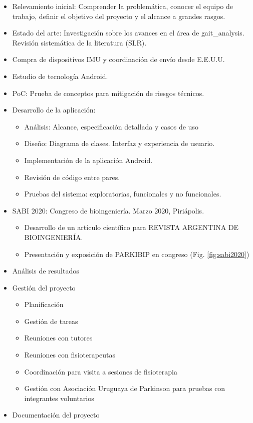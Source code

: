 \begin{itemize}
    \item Relevamiento inicial: Comprender la problemática, conocer el equipo de trabajo, definir el objetivo del proyecto y el alcance a grandes rasgos.
    \item Estado del arte: Investigación sobre los avances en el área de \gls{gait_analysis}. Revisión sistemática de la literatura (SLR).
    \item Compra de dispositivos IMU y coordinación de envío desde E.E.U.U.
    \item Estudio de tecnología Android.
    \item PoC: Prueba de conceptos para mitigación de riesgos técnicos. 
    \item Desarrollo de la aplicación:
    \begin{itemize}
        \item Análisis: Alcance, especificación detallada y casos de uso
        \item Diseño: Diagrama de clases. Interfaz y experiencia de usuario. 
        \item Implementación de la aplicación Android.
        \item Revisión de código entre pares.
        \item Pruebas del sistema: exploratorias, funcionales y no funcionales. 
    \end{itemize}
    \item SABI 2020: Congreso de bioingeniería. Marzo 2020, Piriápolis.
        \begin{itemize}
            \item Desarrollo de un artículo científico para REVISTA ARGENTINA DE BIOINGENIERÍA. 
            \item Presentación y exposición de PARKIBIP en congreso (Fig. \ref{fig:sabi2020})
        \end{itemize}
    \item Análisis de resultados 
    \item Gestión del proyecto
        \begin{itemize}
            \item Planificación
            \item Gestión de tareas
            \item Reuniones con tutores
	        \item Reuniones con fisioterapeutas
	        \item Coordinación para visita a sesiones de fisioterapia
	        \item Gestión con Asociación Uruguaya de Parkinson para pruebas con integrantes voluntarios 
        \end{itemize} 
    \item Documentación del proyecto
\end{itemize}

